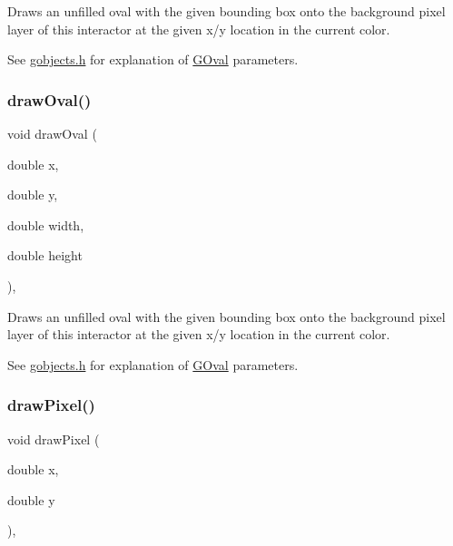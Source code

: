 Draws an unfilled oval with the given bounding box onto the background pixel layer of this interactor at the given x/y location in the current color. 

See \mbox{\hyperlink{gobjects_8h_source}{gobjects.\+h}} for explanation of \mbox{\hyperlink{classGOval}{G\+Oval}} parameters. \mbox{\label{classGDrawingSurface_aa5b1cf902e578907da3c63060686354e}} 
\subsubsection{\texorpdfstring{draw\+Oval()}{drawOval()}\hspace{0.1cm}{\footnotesize\ttfamily [2/2]}}
{\footnotesize\ttfamily void draw\+Oval (\begin{DoxyParamCaption}\item[{double}]{x,  }\item[{double}]{y,  }\item[{double}]{width,  }\item[{double}]{height }\end{DoxyParamCaption})\hspace{0.3cm}{\ttfamily [virtual]}, {\ttfamily [inherited]}}



Draws an unfilled oval with the given bounding box onto the background pixel layer of this interactor at the given x/y location in the current color. 

See \mbox{\hyperlink{gobjects_8h_source}{gobjects.\+h}} for explanation of \mbox{\hyperlink{classGOval}{G\+Oval}} parameters. \mbox{\label{classGDrawingSurface_a0c1e2923d8d163d62d0896d8c5cfa191}} 
\subsubsection{\texorpdfstring{draw\+Pixel()}{drawPixel()}\hspace{0.1cm}{\footnotesize\ttfamily [1/3]}}
{\footnotesize\ttfamily void draw\+Pixel (\begin{DoxyParamCaption}\item[{double}]{x,  }\item[{double}]{y }\end{DoxyParamCaption})\hspace{0.3cm}{\ttfamily [virtual]}, {\ttfamily [inherited]}}



